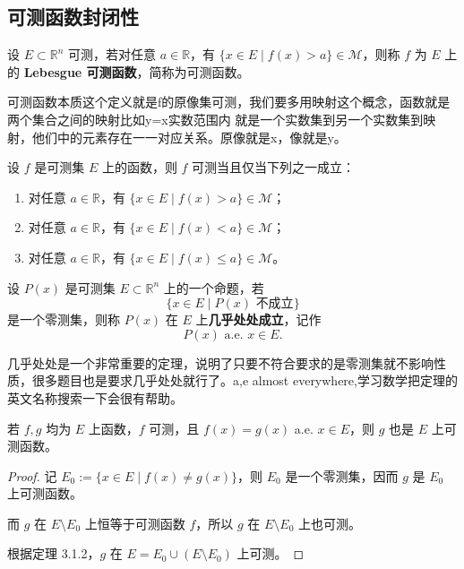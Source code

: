 \documentclass[lang=cn,10pt]{elegantbook}
\begin{document}
\subsection{可测函数封闭性}
\begin{definition}
设 $E \subset \mathbb{R}^n$ 可测，若对任意 $a \in \mathbb{R}$，有 $\{x \in E \mid f(x) > a\} \in \mathcal{M}$，则称 $f$ 为 $E$ 上的 \textbf{Lebesgue 可测函数}，简称为可测函数。
\end{definition}
可测函数本质这个定义就是f的原像集可测，我们要多用映射这个概念，函数就是两个集合之间的映射比如y=x实数范围内 就是一个实数集到另一个实数集到映射，他们中的元素存在一一对应关系。原像就是x，像就是y。
\begin{theorem}[可测函数的等价表述]
设 $f$ 是可测集 $E$ 上的函数，则 $f$ 可测当且仅当下列之一成立：
\begin{enumerate}
  \item 对任意 $a \in \mathbb{R}$，有 $\{x \in E \mid f(x) > a\} \in \mathcal{M}$；
  \item 对任意 $a \in \mathbb{R}$，有 $\{x \in E \mid f(x) < a\} \in \mathcal{M}$；
  \item 对任意 $a \in \mathbb{R}$，有 $\{x \in E \mid f(x) \leq a\} \in \mathcal{M}$。
\end{enumerate}
\end{theorem}
\begin{definition}
设 $P(x)$ 是可测集 $E \subset \mathbb{R}^n$ 上的一个命题，若
\[
\{x \in E \mid P(x) \text{ 不成立} \}
\]
是一个零测集，则称 $P(x)$ 在 $E$ 上\textbf{几乎处处成立}，记作
\[
P(x) \text{ a.e. } x \in E.
\]
\end{definition}

几乎处处是一个非常重要的定理，说明了只要不符合要求的是零测集就不影响性质，很多题目也是要求几乎处处就行了。a,e almost everywhere,学习数学把定理的英文名称搜索一下会很有帮助。

\begin{theorem}[几乎处处相等的函数具有相同的可测性]
若 $f, g$ 均为 $E$ 上函数，$f$ 可测，且 $f(x) = g(x)$ a.e. $x \in E$，则 $g$ 也是 $E$ 上可测函数。
\end{theorem}

\begin{proof}
记 $E_0 := \{x \in E \mid f(x) \neq g(x)\}$，则 $E_0$ 是一个零测集，因而 $g$ 是 $E_0$ 上可测函数。

而 $g$ 在 $E \setminus E_0$ 上恒等于可测函数 $f$，所以 $g$ 在 $E \setminus E_0$ 上也可测。

根据定理 3.1.2，$g$ 在 $E = E_0 \cup (E \setminus E_0)$ 上可测。
\end{proof}
\end{document}
